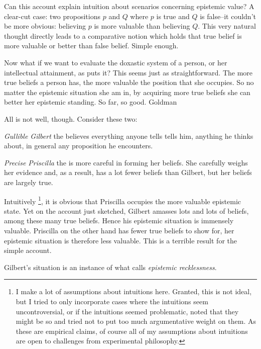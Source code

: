 \documentclass[12pt,numbers=noenddot]{scrartcl}
\begin{document}
Can this account explain intuition about scenarios concerning epistemic value?  A clear-cut case: two propositions $p$ and $Q$ where $p$ is true and $Q$ is false–it couldn't be more obvious: believing $p$ is more valuable than believing $Q$. This very natural thought directly leads to a comparative notion which holds that true belief is more valuable or better than false belief. Simple enough.

Now what if we want to evaluate the doxastic system of a person, or her intellectual attainment, as \textcite[58]{Goldman2002-GOLTUO-2} puts it? This seems just as straightforward. The more true beliefs a person has, the more valuable the position that she occupies. So no matter the epistemic situation she am in, by acquiring more true beliefs she can better her epistemic standing. So far, so good. Goldman\textcite[59]{Goldman2002-GOLTUO-2}

All is not well, though. Consider these two:
\begin{description}
    \item \emph{Gullible Gilbert} the believes everything anyone tells tells him, anything he thinks about, in general any proposition he encounters.
    \item \emph{Precise Priscilla} the is more careful in forming her beliefs. She carefully weighs her evidence and, as a result, has a lot fewer beliefs than Gilbert, but her beliefs are largely true.
\end{description}

Intuitively
\footnote{I make a lot of assumptions about intuitions here. Granted, this is not ideal, but I tried to only incorporate cases where the intuitions seem uncontroversial, or if the intuitions seemed problematic, noted that they might be so and tried not to put too much argumentative weight on them. As these are empirical claims, of course all of my assumptions about intuitions are open to challenges from experimental philosophy.},
it is obvious that Priscilla occupies the more valuable epistemic state. Yet on the account just sketched, Gilbert amasses lots and lots of beliefs, among these many true beliefs. Hence his epistemic situation is immensely valuable. Priscilla on the other hand has fewer true beliefs to show for, her epistemic situation is therefore less valuable. This is a terrible result for the simple account.

Gilbert’s situation is an instance of what \textcite[360]{Berker2013-BERETA-2} calls \emph{epistemic recklessness}. 
\end{document}
